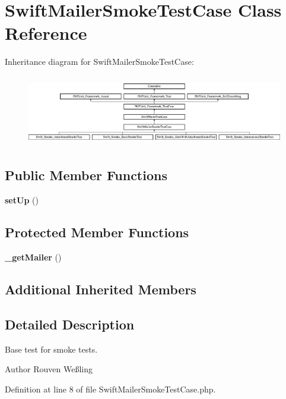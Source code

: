\section{Swift\+Mailer\+Smoke\+Test\+Case Class Reference}
\label{class_swift_mailer_smoke_test_case}
Inheritance diagram for Swift\+Mailer\+Smoke\+Test\+Case\+:\begin{figure}[H]
\begin{center}
\leavevmode
\includegraphics[height=3.134329cm]{class_swift_mailer_smoke_test_case}
\end{center}
\end{figure}
\subsection*{Public Member Functions}
\begin{DoxyCompactItemize}
\item 
{\bf set\+Up} ()
\end{DoxyCompactItemize}
\subsection*{Protected Member Functions}
\begin{DoxyCompactItemize}
\item 
{\bf \+\_\+get\+Mailer} ()
\end{DoxyCompactItemize}
\subsection*{Additional Inherited Members}


\subsection{Detailed Description}
Base test for smoke tests.

\begin{DoxyAuthor}{Author}
Rouven Weßling 
\end{DoxyAuthor}


Definition at line 8 of file Swift\+Mailer\+Smoke\+Test\+Case.\+php.



